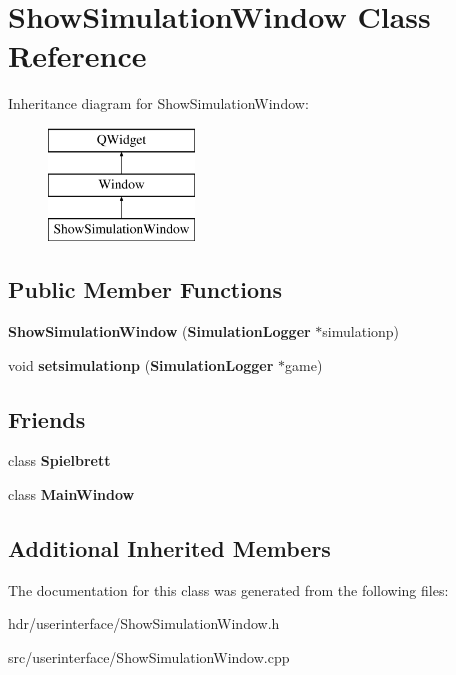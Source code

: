 \section{Show\-Simulation\-Window Class Reference}
\label{class_show_simulation_window}
Inheritance diagram for Show\-Simulation\-Window\-:\begin{figure}[H]
\begin{center}
\leavevmode
\includegraphics[height=3.000000cm]{class_show_simulation_window}
\end{center}
\end{figure}
\subsection*{Public Member Functions}
\begin{DoxyCompactItemize}
\item 
{\bfseries Show\-Simulation\-Window} ({\bf Simulation\-Logger} $\ast$simulationp)\label{class_show_simulation_window_ac3228fe7deb7a1a313d9eeb1b3fa25ea}

\item 
void {\bfseries setsimulationp} ({\bf Simulation\-Logger} $\ast$game)\label{class_show_simulation_window_a7cc9d103f7e9bf078cdd7bf8492bb741}

\end{DoxyCompactItemize}
\subsection*{Friends}
\begin{DoxyCompactItemize}
\item 
class {\bfseries Spielbrett}\label{class_show_simulation_window_a6c7b6620b9129799f52341ffa94cff69}

\item 
class {\bfseries Main\-Window}\label{class_show_simulation_window_af9db4b672c4d3104f5541893e08e1809}

\end{DoxyCompactItemize}
\subsection*{Additional Inherited Members}


The documentation for this class was generated from the following files\-:\begin{DoxyCompactItemize}
\item 
hdr/userinterface/Show\-Simulation\-Window.\-h\item 
src/userinterface/Show\-Simulation\-Window.\-cpp\end{DoxyCompactItemize}
